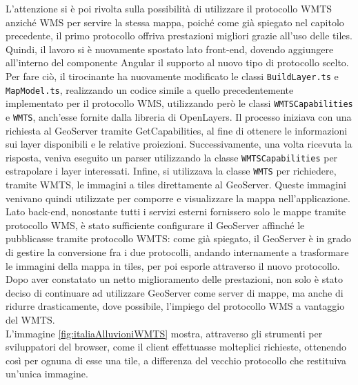 L'attenzione si è poi rivolta sulla possibilità di utilizzare il protocollo WMTS anziché WMS per servire la stessa mappa, poiché come già spiegato nel capitolo precedente, il primo protocollo offriva prestazioni migliori grazie all'uso delle tiles.
\\Quindi, il lavoro si è nuovamente spostato lato front-end, dovendo aggiungere all'interno del componente Angular il supporto al nuovo tipo di protocollo scelto. Per fare ciò, il tirocinante ha nuovamente modificato le classi \verb|BuildLayer.ts| e \verb|MapModel.ts|, realizzando un codice simile a quello precedentemente implementato per il protocollo WMS, utilizzando però le classi \verb|WMTSCapabilities| e \verb|WMTS|, anch'esse fornite dalla libreria di OpenLayers. Il processo iniziava con una richiesta al GeoServer tramite GetCapabilities, al fine di ottenere le informazioni sui layer disponibili e le relative proiezioni. Successivamente, una volta ricevuta la risposta, veniva eseguito un parser utilizzando la classe \verb|WMTSCapabilities| per estrapolare i layer interessati. Infine, si utilizzava la classe \verb|WMTS| per richiedere, tramite WMTS, le immagini a tiles direttamente al GeoServer. Queste immagini venivano quindi utilizzate per comporre e visualizzare la mappa nell'applicazione.
\\Lato back-end, nonostante tutti i servizi esterni fornissero solo le mappe tramite protocollo WMS, è stato sufficiente configurare il GeoServer affinché le pubblicasse tramite protocollo WMTS: come già spiegato, il GeoServer è in grado di gestire la conversione fra i due protocolli, andando internamente a trasformare le immagini della mappa in tiles, per poi esporle attraverso il nuovo protocollo.
\\Dopo aver constatato un netto miglioramento delle prestazioni, non solo è stato deciso di continuare ad utilizzare GeoServer come server di mappe, ma anche di ridurre drasticamente, dove possibile, l'impiego del protocollo WMS a vantaggio del WMTS.
\\L'immagine \ref{fig:italiaAlluvioniWMTS} mostra, attraverso gli strumenti per sviluppatori del browser, come il client effettuasse molteplici richieste, ottenendo così per ognuna di esse una tile, a differenza del vecchio protocollo che restituiva un'unica immagine.

